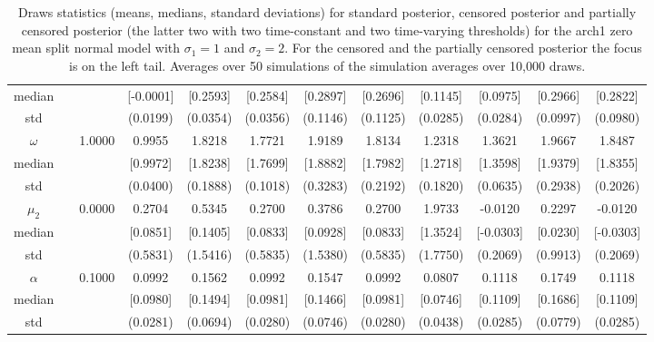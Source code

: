 {\begin{sidewaystable}
\begin{tabular}{cc cc| cccc| cccc}
median &&  & [-0.0001] & [0.2593] & [0.2584] & [0.2897] & [0.2696] & [0.1145] & [0.0975] & [0.2966] & [0.2822]  \\ 
std &&   & (0.0199) & (0.0354) & (0.0356) & (0.1146) & (0.1125) &(0.0285) & (0.0284) & (0.0997) & (0.0980)  \\ 
 \rowcolor{LightCyan} 
$\omega$&& 1.0000 & 0.9955 & 1.8218 & 1.7721 & 1.9189 & 1.8134 & 1.2318 & 1.3621 & 1.9667 & 1.8487  \\   
median &&  & [0.9972] & [1.8238] & [1.7699] & [1.8882] & [1.7982] & [1.2718] & [1.3598] & [1.9379] & [1.8355]  \\ 
std &&   & (0.0400) & (0.1888) & (0.1018) & (0.3283) & (0.2192) &(0.1820) & (0.0635) & (0.2938) & (0.2026)  \\ 
 \rowcolor{LightCyan} 
$\mu_{2}$&& 0.0000 & 0.2704 & 0.5345 & 0.2700 & 0.3786 & 0.2700 & 1.9733 & -0.0120 & 0.2297 & -0.0120  \\   
median &&  & [0.0851] & [0.1405] & [0.0833] & [0.0928] & [0.0833] & [1.3524] & [-0.0303] & [0.0230] & [-0.0303]  \\ 
std &&   & (0.5831) & (1.5416) & (0.5835) & (1.5380) & (0.5835) &(1.7750) & (0.2069) & (0.9913) & (0.2069)  \\ 
 \rowcolor{LightCyan} 
$\alpha$&& 0.1000 & 0.0992 & 0.1562 & 0.0992 & 0.1547 & 0.0992 & 0.0807 & 0.1118 & 0.1749 & 0.1118  \\   
median &&  & [0.0980] & [0.1494] & [0.0981] & [0.1466] & [0.0981] & [0.0746] & [0.1109] & [0.1686] & [0.1109]  \\ 
std &&   & (0.0281) & (0.0694) & (0.0280) & (0.0746) & (0.0280) &(0.0438) & (0.0285) & (0.0779) & (0.0285)  \\ 
\hline 
\end{tabular}
 \caption{Draws statistics (means, medians, standard deviations) for standard posterior, censored posterior and partially censored posterior (the latter two with two time-constant and two time-varying thresholds) for the arch1 zero mean split normal model with $\sigma_{1} = 1$ and $\sigma_{2} = 2$. For the censored and the partially censored posterior the focus is on the left tail. Averages over 50 simulations of the simulation averages over 10,000 draws.} 
\label{tab:arch1_pcp_draws}  
\end{sidewaystable}
}